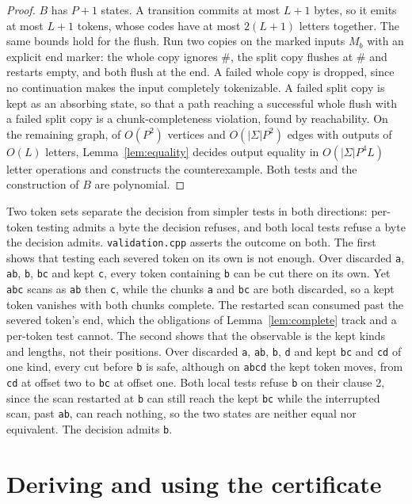 \documentclass[11pt,a4paper]{article}
\theoremstyle{definition}
\theoremstyle{plain}
\newcommand{\code}[1]{\texttt{#1}}
\begin{document}
\begin{proof}
$B$ has $P + 1$ states. A transition commits at most $L + 1$ bytes, so it emits at most $L + 1$ tokens, whose codes have
at most $2(L + 1)$ letters together. The same bounds hold for the flush. Run two copies on the marked inputs $M_b$ with
an explicit end marker: the whole copy ignores $\#$, the split copy flushes at $\#$ and restarts empty, and both flush
at the end. A failed whole copy is dropped, since no continuation makes the input completely tokenizable. A failed split
copy is kept as an absorbing state, so that a path reaching a successful whole flush with a failed split copy is a
chunk-completeness violation, found by reachability. On the remaining graph, of $O(P^2)$ vertices and $O(|\Sigma| P^2)$
edges with outputs of $O(L)$ letters, Lemma~\ref{lem:equality} decides output equality in $O(|\Sigma| P^4 L)$ letter
operations and constructs the counterexample. Both tests and the construction of $B$ are polynomial.
\end{proof}

Two token sets separate the decision from simpler tests in both directions: per-token testing admits a byte the decision
refuses, and both local tests refuse a byte the decision admits. \code{validation.cpp} asserts the outcome on both. The
first shows that testing each severed token on its own is not enough. Over discarded \code{a}, \code{ab}, \code{b},
\code{bc} and kept \code{c}, every token containing \code{b} can be cut there on its own. Yet \code{abc} scans as
\code{ab} then \code{c}, while the chunks \code{a} and \code{bc} are both discarded, so a kept token vanishes with both
chunks complete. The restarted scan consumed past the severed token's end, which the obligations of
Lemma~\ref{lem:complete} track and a per-token test cannot. The second shows that the observable is the kept kinds and
lengths, not their positions. Over discarded \code{a}, \code{ab}, \code{b}, \code{d} and kept \code{bc} and \code{cd} of
one kind, every cut before \code{b} is safe, although on \code{abcd} the kept token moves, from \code{cd} at offset two
to \code{bc} at offset one. Both local tests refuse \code{b} on their clause 2, since the scan restarted at \code{b} can
still reach the kept \code{bc} while the interrupted scan, past \code{ab}, can reach nothing, so the two states are
neither equal nor equivalent. The decision admits \code{b}.

\section{Deriving and using the certificate}
\label{sec:derivation}
\end{document}
